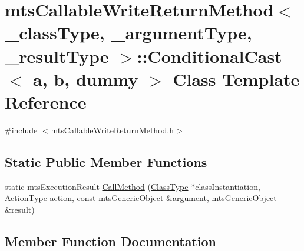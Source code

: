 \hypertarget{classmts_callable_write_return_method_1_1_conditional_cast}{}\section{mts\+Callable\+Write\+Return\+Method$<$ \+\_\+class\+Type, \+\_\+argument\+Type, \+\_\+result\+Type $>$\+:\+:Conditional\+Cast$<$ a, b, dummy $>$ Class Template Reference}
\label{classmts_callable_write_return_method_1_1_conditional_cast}


{\ttfamily \#include $<$mts\+Callable\+Write\+Return\+Method.\+h$>$}

\subsection*{Static Public Member Functions}
\begin{DoxyCompactItemize}
\item 
static mts\+Execution\+Result \hyperlink{classmts_callable_write_return_method_1_1_conditional_cast_a09bbeecbf815ac72ff2ad0070f71f98a}{Call\+Method} (\hyperlink{classmts_callable_write_return_method_a51dbe6298941ab172d83182c8188092d}{Class\+Type} $\ast$class\+Instantiation, \hyperlink{classmts_callable_write_return_method_a650562eae4db20a5cfbbff0f9f7e1a0a}{Action\+Type} action, const \hyperlink{classmts_generic_object}{mts\+Generic\+Object} \&argument, \hyperlink{classmts_generic_object}{mts\+Generic\+Object} \&result)
\end{DoxyCompactItemize}


\subsection{Member Function Documentation}
\hypertarget{classmts_callable_write_return_method_1_1_conditional_cast_a09bbeecbf815ac72ff2ad0070f71f98a}{}
